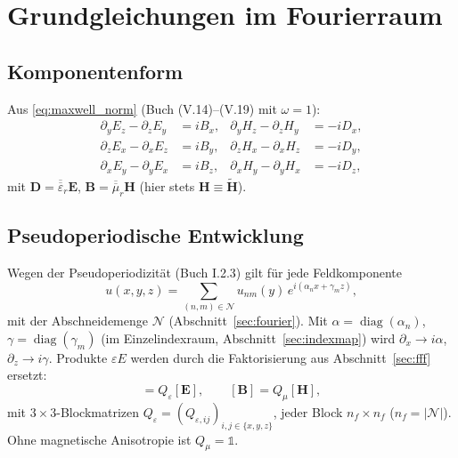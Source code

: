 \section{Grundgleichungen im Fourierraum}\label{sec:equations}

\subsection{Komponentenform}
Aus \eqref{eq:maxwell_norm} (Buch (V.14)--(V.19) mit $\omega=1$):
\begin{align}
  \partial_yE_z-\partial_zE_y&=iB_x, & \partial_yH_z-\partial_zH_y&=-iD_x,\label{eq:mx1}\\
  \partial_zE_x-\partial_xE_z&=iB_y, & \partial_zH_x-\partial_xH_z&=-iD_y,\label{eq:mx2}\\
  \partial_xE_y-\partial_yE_x&=iB_z, & \partial_xH_y-\partial_yH_x&=-iD_z,\label{eq:mx3}
\end{align}
mit $\mathbf D=\overline{\overline\varepsilon}_r\mathbf E$, $\mathbf B=\overline{\overline\mu}_r\mathbf H$ (hier stets
$\mathbf H\equiv\tilde{\mathbf H}$).

\subsection{Pseudoperiodische Entwicklung}
Wegen der Pseudoperiodizität (Buch I.2.3) gilt für jede Feldkomponente
\begin{equation}
  u(x,y,z)=\sum_{(n,m)\in\mathcal N}u_{nm}(y)\,e^{i(\alpha_nx+\gamma_mz)},
  \label{eq:pseudo}
\end{equation}
mit der Abschneidemenge $\mathcal N$ (Abschnitt~\ref{sec:fourier}). Mit $\alpha=\operatorname{diag}(\alpha_n)$,
$\gamma=\operatorname{diag}(\gamma_m)$ (im Einzelindexraum, Abschnitt~\ref{sec:indexmap}) wird
$\partial_x\to i\alpha$, $\partial_z\to i\gamma$. Produkte $\varepsilon E$ werden durch die
Faktorisierung aus Abschnitt~\ref{sec:fff} ersetzt:
\begin{equation}
  [\mathbf D]=Q_\varepsilon[\mathbf E],\qquad [\mathbf B]=Q_\mu[\mathbf H],
  \label{eq:Qdef}
\end{equation}
mit $3\times3$-Blockmatrizen $Q_\varepsilon=(Q_{\varepsilon,ij})_{i,j\in\{x,y,z\}}$, jeder Block
$n_f\times n_f$ ($n_f=|\mathcal N|$). Ohne magnetische Anisotropie ist $Q_\mu=\mathbb 1$.


